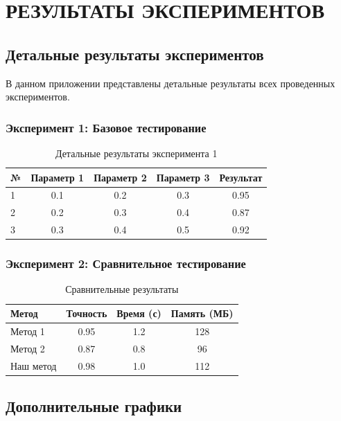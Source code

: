 \chapter{РЕЗУЛЬТАТЫ ЭКСПЕРИМЕНТОВ}

\section{Детальные результаты экспериментов}

В данном приложении представлены детальные результаты всех проведенных экспериментов.

\subsection{Эксперимент 1: Базовое тестирование}

\begin{table}[H]
\centering
\caption{Детальные результаты эксперимента 1}
\begin{tabular}{|l|c|c|c|c|}
\hline
№ & Параметр 1 & Параметр 2 & Параметр 3 & Результат \\
\hline
1 & 0.1 & 0.2 & 0.3 & 0.95 \\
2 & 0.2 & 0.3 & 0.4 & 0.87 \\
3 & 0.3 & 0.4 & 0.5 & 0.92 \\
\hline
\end{tabular}
\label{tab:detailed_exp1}
\end{table}

\subsection{Эксперимент 2: Сравнительное тестирование}

\begin{table}[H]
\centering
\caption{Сравнительные результаты}
\begin{tabular}{|l|c|c|c|}
\hline
Метод & Точность & Время (с) & Память (МБ) \\
\hline
Метод 1 & 0.95 & 1.2 & 128 \\
Метод 2 & 0.87 & 0.8 & 96 \\
Наш метод & 0.98 & 1.0 & 112 \\
\hline
\end{tabular}
\label{tab:comparison}
\end{table}

\section{Дополнительные графики}

